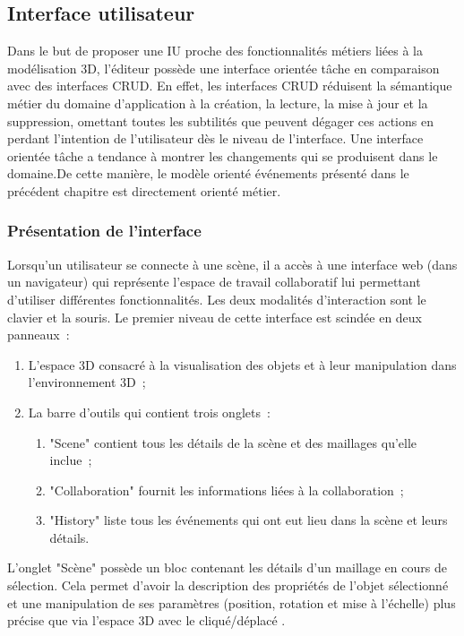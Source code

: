 \subsection{Interface utilisateur}
Dans le but de proposer une \gls{IU} proche des fonctionnalités métiers liées à la 
modélisation 3D, l'éditeur possède une interface orientée tâche en comparaison 
avec des interfaces CRUD. En effet, les interfaces CRUD réduisent la sémantique 
métier du domaine d'application à la création, la lecture, la mise à jour et la 
suppression, omettant toutes les subtilités que peuvent dégager ces actions en 
perdant l'intention de l'utilisateur dès le niveau de l'interface. Une 
interface orientée tâche a tendance à montrer les changements qui se produisent 
dans le domaine.De cette manière, le modèle orienté événements présenté dans 
le précédent chapitre est directement orienté métier. 
\subsubsection{Présentation de l'interface}

Lorsqu'un utilisateur se connecte à une scène, il a accès à une interface web 
(dans un navigateur) qui représente l'espace de travail collaboratif lui permettant 
d'utiliser différentes fonctionnalités. Les deux modalités d'interaction sont le clavier 
et la souris. Le premier niveau de cette 
interface est scindée en deux panneaux~: 
\begin{enumerate}
	\item L'espace 3D consacré à la visualisation des objets et à leur manipulation 
	dans l'environnement 3D~;
	\item La barre d'outils qui contient trois onglets~:~
	\begin{enumerate}
		\item "Scene" contient tous les détails de la scène et des maillages qu'elle 
		inclue~; 
		\item "Collaboration" fournit les informations liées à la collaboration~;
		\item "History" liste tous les événements qui ont eut lieu dans la scène et 
		leurs  détails. 
	\end{enumerate}
\end{enumerate}

L'onglet "Scène" possède un bloc contenant les détails d'un maillage en cours de 
sélection. Cela permet d'avoir la description des propriétés de l'objet sélectionné et 
une manipulation de ses paramètres (position, rotation et mise à l'échelle) plus 
précise que via l'espace 3D avec le cliqué/déplacé .

